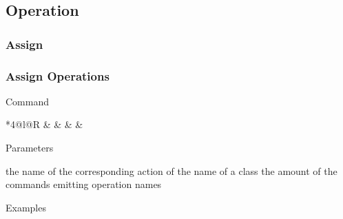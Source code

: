 \documentclass[9pt]{beamer}
\begin{document}
\subsection{Operation}

\subsubsection{Assign}

\begin{frame}[t] \frametitle{Assign Operations}

	\begin{block}{Command}
		\begin{CmdFmt}{*{4}{@{}l}@{}R}
			 &
			 &
			 &
			 & \InstrItem
		\end{CmdFmt}
	\end{block}

	\begin{block}{Parameters}
		\begin{itemize}
			 the name of the corresponding action of 
			  the name of a class
			 the amount of the commands emitting operation names
		\end{itemize}
	\end{block}

	\begin{block}{Examples}
	\end{block}

\end{frame}
\end{document}
